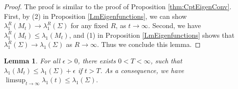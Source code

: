\documentclass[12pt]{amsart}
\numberwithin{equation}{section}
\newtheorem{lemma}[theorem]{Lemma}
\numberwithin{equation}{section}
\begin{document}
	\begin{proof}
		The proof is similar to the proof of Proposition \ref{thm:CptEigenConv}. First, by (2) in Proposition \ref{LmEigenfunctions}, we can show $\lambda_1^R(M_t)\to\lambda_1^R(\Sigma)$ for any fixed $R$, as $t\to\infty$. Second, we have $\lambda_1^R(M_t)\leq \lambda_1(M_t)$, and (1) in Proposition \ref{LmEigenfunctions} shows that $\lambda_1^R(\Sigma)\to\lambda_1(\Sigma)$ as $R\to\infty$. Thus we conclude this lemma.
	\end{proof}
	
	\begin{lemma}\label{lem:eigenconverge-2}
		For all $\epsilon>0$, there exists $0<T<\infty$, such that $\lambda_1(M_t)\leq\lambda_1(\Sigma)+\epsilon$ if $t>T$.
		As a consequence, we have 
		$\limsup_{t\to\infty}\lambda_1(t)\leq \lambda_1(\Sigma).$\end{lemma}
\end{document}
